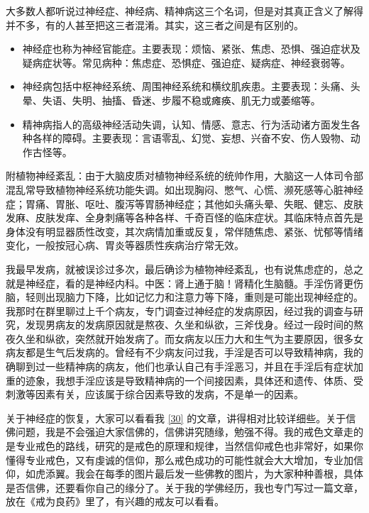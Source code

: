 \begin{case}
    大多数人都听说过神经症、神经病、精神病这三个名词，但是对其真正含义了解得并不多，有的人甚至把这三者混淆。其实，这三者之间是有区别的。

    \begin{itemize}
        \item 神经症也称为神经官能症。主要表现：烦恼、紧张、焦虑、恐惧、强迫症状及疑病症状等。常见病种：焦虑症、恐惧症、强迫症、疑病症、神经衰弱等。
        \item 神经病包括中枢神经系统、周围神经系统和横纹肌疾患。主要表现：头痛、头晕、失语、失明、抽搐、昏迷、步履不稳或瘫痪、肌无力或萎缩等。
        \item 精神病指人的高级神经活动失调，认知、情感、意志、行为活动诸方面发生各种各样的障碍。主要表现：言语零乱、幻觉、妄想、兴奋不安、伤人毁物、动作古怪等。
    \end{itemize}

    附植物神经紊乱：由于大脑皮质对植物神经系统的统帅作用，大脑这一人体司令部混乱常导致植物神经系统功能失调。如出现胸闷、憋气、心慌、濒死感等心脏神经症；胃痛、胃胀、呕吐、腹泻等胃肠神经症；其他如头痛头晕、失眠、健忘、皮肤发麻、皮肤发痒、全身刺痛等各种各样、千奇百怪的临床症状。其临床特点首先是身体没有明显器质性改变，其次病情加重或反复，常伴随焦虑、紧张、忧郁等情绪变化，一般按冠心病、胃炎等器质性疾病治疗常无效。

    我最早发病，就被误诊过多次，最后确诊为植物神经紊乱，也有说焦虑症的，总之就是神经症，看的是神经内科。中医：肾上通于脑！肾精化生脑髓。手淫伤肾更伤脑，轻则出现脑力下降，比如记忆力和注意力等下降，重则是可能出现神经症的。我那时在群里聊过上千个病友，专门调查过神经症的发病原因，经过我的调查与研究，发现男病友的发病原因就是熬夜、久坐和纵欲，三斧伐身。经过一段时间的熬夜久坐和纵欲，突然就开始发病了。而女病友以压力大和生气为主要原因，很多女病友都是生气后发病的。曾经有不少病友问过我，手淫是否可以导致精神病，我的确聊到过一些精神病的病友，他们也承认自己有手淫恶习，并且在手淫后有症状加重的迹象，我想手淫应该是导致精神病的一个间接因素，具体还和遗传、体质、受刺激等因素有关，应该属于综合因素导致的发病，不是单一的因素。

    关于神经症的恢复，大家可以看看我 \ref{30} 的文章，讲得相对比较详细些。关于信佛问题，我是不会强迫大家信佛的，信佛讲究随缘，勉强不得。我的戒色文章走的是专业戒色的路线，研究的是戒色的原理和规律，当然信仰戒色也非常好，如果你懂得专业戒色，又有虔诚的信仰，那么戒色成功的可能性就会大大增加，专业加信仰，如虎添翼。我会在每季的图片最后发一些佛教的图片，为大家种种善根，具体是否信佛，还要看你自己的缘分了。关于我的学佛经历，我也专门写过一篇文章，放在《戒为良药》里了，有兴趣的戒友可以看看。
\end{case}

